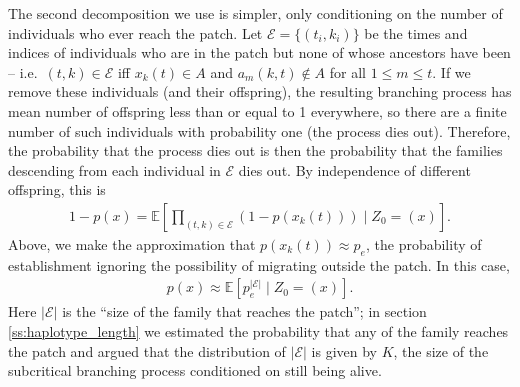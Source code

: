 \documentclass{article}
\newcommand{\E}{\mathbb{E}}
\newcommand{\calE}{\mathcal{E}}
\begin{document}
The second decomposition we use is simpler, only conditioning on the number of individuals who ever reach the patch.  
Let $\calE = \{(t_i,k_i)\}$ be the times and indices of individuals who are in the patch but none of whose ancestors have been --
i.e.\ $(t,k) \in \calE$ iff $x_k(t) \in A$ and $a_m(k,t) \notin A$ for all $1\le m \le t$.
If we remove these individuals (and their offspring), the resulting branching process has mean number of offspring less than or equal to 1 everywhere,
so there are a finite number of such individuals with probability one (the process dies out).
Therefore, the probability that the process dies out is then the probability that the families descending from each individual in $\calE$ dies out.
By independence of different offspring, this is
\begin{align}
  1-p(x) = \E\left[ \prod_{(t,k) \in \calE} (1-p(x_k(t))) \; \vert \; Z_0 = (x) \right] .
\end{align}
Above, we make the approximation that $p(x_k(t)) \approx p_e$,
the probability of establishment ignoring the possibility of migrating outside the patch.
In this case,
\begin{align}
  p(x) \approx \E\left[ p_e^{|\calE|} \; \vert \; Z_0 = (x) \right] .
\end{align}
Here $|\calE|$ is the ``size of the family that reaches the patch'';
in section \ref{ss:haplotype_length} we estimated the probability that any of the family reaches the patch
and argued that the distribution of $|\calE|$ is given by $K$,
the size of the subcritical branching process conditioned on still being alive.
\end{document}
